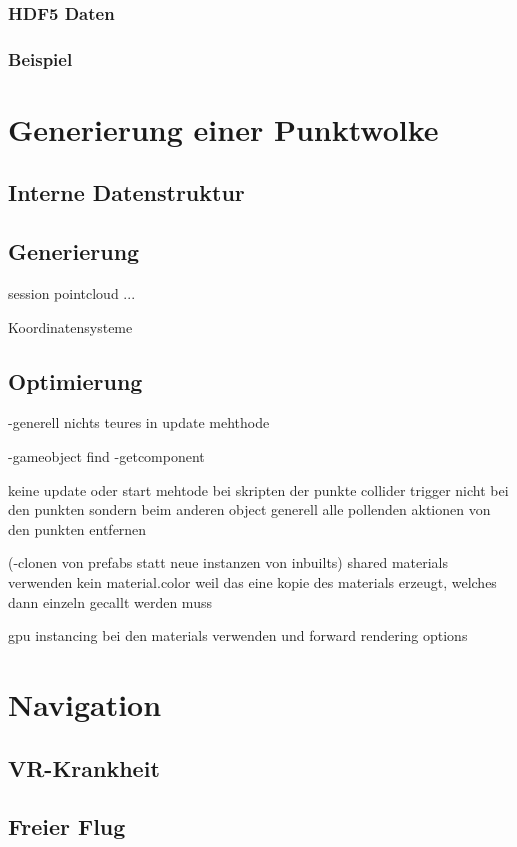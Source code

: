 \subsubsection{HDF5 Daten}
\label{sec:HDF5}
\subsubsection{Beispiel}

\section{Generierung einer Punktwolke}
\label{sec:Generierung}

\subsection{Interne Datenstruktur}
\label{sec:IDS}

\subsection{Generierung}
\label{sec:PclGenerate}
session
pointcloud
...

Koordinatensysteme

\subsection{Optimierung}
-generell nichts teures in update mehthode
	
-gameobject find
-getcomponent

keine update oder start mehtode bei skripten der punkte
collider trigger nicht bei den punkten sondern beim anderen object
generell alle pollenden aktionen von den punkten entfernen


(-clonen von prefabs statt neue instanzen von inbuilts)
shared materials verwenden   kein material.color weil das eine kopie des materials erzeugt, welches dann einzeln gecallt werden muss

gpu instancing bei den materials verwenden und forward rendering options

\section{Navigation}
\label{sec:Navigation}
\subsection{VR-Krankheit}
\subsection{Freier Flug}
